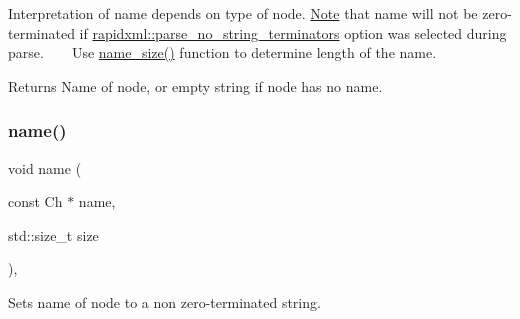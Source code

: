 Interpretation of name depends on type of node. \mbox{\hyperlink{classNote}{Note}} that name will not be zero-\/terminated if \mbox{\hyperlink{namespacerapidxml_a9cae3801e70437cbc410c24bf6be691c}{rapidxml\+::parse\+\_\+no\+\_\+string\+\_\+terminators}} option was selected during parse. ~\newline
~\newline
 Use \mbox{\hyperlink{classrapidxml_1_1xml__base_ad01e2eff02202b130baad012d1ed7328}{name\+\_\+size()}} function to determine length of the name. \begin{DoxyReturn}{Returns}
Name of node, or empty string if node has no name. 
\end{DoxyReturn}
\mbox{\label{classrapidxml_1_1xml__base_a4e7e23d06d48126c65b1f6266acfba5c}} 
\subsubsection{\texorpdfstring{name()}{name()}\hspace{0.1cm}{\footnotesize\ttfamily [2/3]}}
{\footnotesize\ttfamily void name (\begin{DoxyParamCaption}\item[{const Ch $\ast$}]{name,  }\item[{std\+::size\+\_\+t}]{size }\end{DoxyParamCaption})\hspace{0.3cm}{\ttfamily [inline]}, {\ttfamily [inherited]}}



Sets name of node to a non zero-\/terminated string. 

